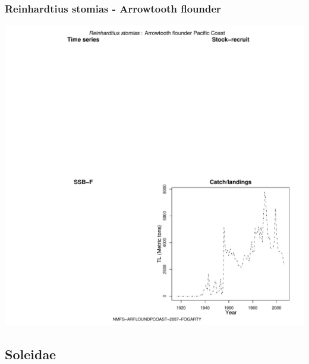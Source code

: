 \subsubsection{Reinhardtius stomias - Arrowtooth flounder}
\begin{center}
\includegraphics[width=1.2\textwidth]{../R/figures/NMFS-ARFLOUNDPCOAST-2007-FOGARTY.pdf}
\end{center}

\subsection{Soleidae}


